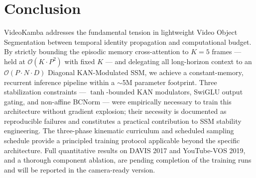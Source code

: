 \documentclass[sigconf]{acmart}
\begin{document}
\section{Conclusion}
VideoKamba addresses the fundamental tension in lightweight Video Object Segmentation between temporal identity propagation and computational budget. By strictly bounding the episodic memory cross-attention to $K=5$ frames — held at $\mathcal{O}(K \cdot P^2)$ with fixed $K$ — and delegating all long-horizon context to an $\mathcal{O}(P \cdot N \cdot D)$ Diagonal KAN-Modulated SSM, we achieve a constant-memory, recurrent inference pipeline within a $\sim$5M parameter footprint. Three stabilization constraints — $\tanh$-bounded KAN modulators, SwiGLU output gating, and non-affine BCNorm — were empirically necessary to train this architecture without gradient explosion; their necessity is documented as reproducible failures and constitutes a practical contribution to SSM stability engineering. The three-phase kinematic curriculum and scheduled sampling schedule provide a principled training protocol applicable beyond the specific architecture. Full quantitative results on DAVIS 2017 and YouTube-VOS 2019, and a thorough component ablation, are pending completion of the training runs and will be reported in the camera-ready version.



\end{document}
